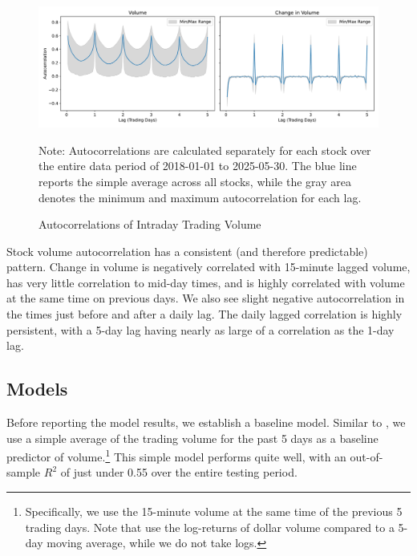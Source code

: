 \documentclass[12pt]{article}
\begin{document}
\begin{figure}[H]
    \centering
    \caption{Autocorrelations of Intraday Trading Volume}
    \includegraphics[width=\linewidth]{../Output/Volume Autocorrelations.pdf}
    \begin{minipage}{0.95\linewidth}
        \footnotesize
        \singlespacing
        Note: Autocorrelations are calculated separately for each stock over the entire data period of 2018-01-01 to 2025-05-30. The blue line reports the simple average across all stocks, while the gray area denotes the minimum and maximum autocorrelation for each lag.
    \end{minipage}
    \label{fig:autocorrelations}
\end{figure}

Stock volume autocorrelation has a consistent (and therefore predictable) pattern. Change in volume is negatively correlated with 15-minute lagged volume, has very little correlation to mid-day times, and is highly correlated with volume at the same time on previous days. We also see slight negative autocorrelation in the times just before and after a daily lag. The daily lagged correlation is highly persistent, with a 5-day lag having nearly as large of a correlation as the 1-day lag. 

\subsection{Models}
Before reporting the model results, we establish a baseline model. Similar to \textcite{goyenko2024trading}, we use a simple average of the trading volume for the past 5 days as a baseline predictor of volume.\footnote{Specifically, we use the 15-minute volume at the same time of the previous 5 trading days. Note that \textcite{goyenko2024trading} use the log-returns of dollar volume compared to a 5-day moving average, while we do not take logs.} This simple model performs quite well, with an out-of-sample $R^2$ of just under 0.55 over the entire testing period.
\end{document}
